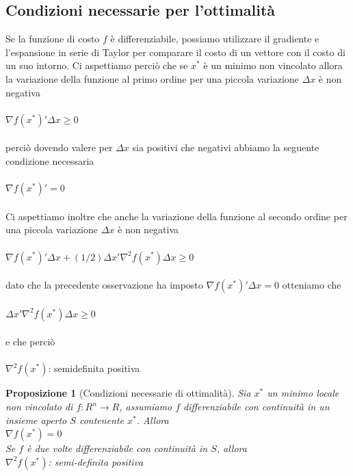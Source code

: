\documentclass[a4paper, 12pt]{article}
\newtheorem{prop}{Proposizione}
\begin{document}
\subsection{Condizioni necessarie per l'ottimalità}
Se la funzione di costo $f$ è differenziabile, possiamo utilizzare il gradiente e l'espansione in serie di Taylor per comparare il costo di un vettore con il costo di un suo intorno.
Ci aspettiamo perciò che se $x^\ast$ è un minimo non vincolato allora la variazione della funzione al primo ordine per una piccola variazione $\Delta x$ è non negativa\\\\
$\nabla f ( x^\ast )' \Delta x \geq 0$\\\\
perciò dovendo valere per $\Delta x$ sia positivi che negativi abbiamo la seguente condizione necessaria\\\\
$\nabla f ( x^\ast )' = 0$\\\\
Ci aspettiamo inoltre che anche la variazione della funzione al secondo ordine per una piccola variazione $\Delta x$ è non negativa\\\\
$\nabla f ( x^\ast )' \Delta x + (1/2) \Delta x' \nabla ^2 f (x^\ast) \Delta x\geq 0$\\\\
dato che la precedente osservazione ha imposto $\nabla f (x^\ast)' \Delta x = 0$ otteniamo che\\\\
$\Delta x' \nabla ^2 f (x^\ast) \Delta x\geq 0$\\\\
e che perciò\\\\
$\nabla ^2 f (x^\ast)$: semidefinita  positiva
\begin{prop}[Condizioni necessarie di ottimalità]
Sia $x^\ast$ un minimo locale non vincolato di $f:R^n \to R$, assumiamo $f$ differenziabile con continuità in un insieme aperto $S$ contenente $x^\ast$. Allora\\
$\nabla f(x^\ast) = 0$\\
Se $f$ è due volte differenziabile con continuità in $S$, allora\\
$\nabla^2 f(x^\ast)$: semi-definita positiva
\end{prop}
\end{document}
